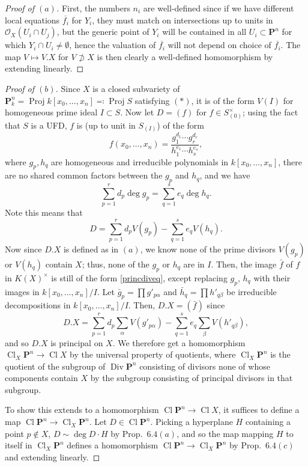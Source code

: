 \documentclass[12pt,letterpaper]{article}
\theoremstyle{definition}
\theoremstyle{remark}
\numberwithin{equation}{section}
\numberwithin{figure}{problem}
\DeclareMathOperator{\Proj}{Proj}
\DeclareMathOperator{\Div}{Div}
\DeclareMathOperator{\Cl}{Cl}
\newcommand{\OO}{\mathcal{O}}
\begin{document}
\begin{proof}[Proof of $(a)$]
  First, the numbers $n_i$ are well-defined since if we have different local equations $\overline{f_i}$ for $Y_i$, they must match on intersections up to units in $\OO_X(U_i \cap U_j)$, but the generic point of $Y_i$ will be contained in all $U_i \subset \mathbf{P}^n$ for which $Y_i \cap U_i \ne \emptyset$, hence the valuation of $\overline{f_i}$ will not depend on choice of $\overline{f_i}$. The map $V \mapsto V.X$ for $V \not\supset X$ is then clearly a well-defined homomorphism by extending linearly.
\end{proof}
\begin{proof}[Proof of $(b)$]
  Since $X$ is a closed subvariety of $\mathbf{P}^n_k = \Proj k[x_0,\ldots,x_n] \eqqcolon \Proj S$ satisfying $(*)$, it is of the form $V(I)$ for homogeneous prime ideal $I \subset S$. Now let $D = (f)$ for $f \in S_{(0)}^\times$; using the fact that $S$ is a UFD, $f$ is (up to unit in $S_{(I)}$) of the form
  \begin{equation}\label{princdiveq}
    f(x_0,\ldots,x_n) = \frac{g_1^{d_1} \cdots g_r^{d_r}}{h_1^{e_1} \cdots h_s^{e_s}},
  \end{equation}
  where $g_p,h_q$ are homogeneous and irreducible polynomials in $k[x_0,\ldots,x_n]$, there are no shared common factors between the $g_p$ and $h_q$, and we have
  \begin{equation*}
    \sum_{p=1}^r d_p\deg g_p = \sum_{q=1}^s e_q \deg h_q.
  \end{equation*}
  Note this means that
  \begin{equation*}
    D = \sum_{p=1}^r d_p V(g_p) - \sum_{q=1}^s e_q V(h_q).
  \end{equation*}
  Now since $D.X$ is defined as in $(a)$, we know none of the prime divisors $V(g_p)$ or $V(h_q)$ contain $X$; thus, none of the $g_p$ or $h_q$ are in $I$. Then, the image $\bar{f}$ of $f$ in $K(X)^\times$ is still of the form \eqref{princdiveq}, except replacing $g_p$, $h_q$ with their images in $k[x_0,\ldots,x_n]/I$. Let $\bar{g}_p = \prod g'_{p\alpha}$ and $\bar{h}_q = \prod h'_{q\beta}$ be irreducible decompositions in $k[x_0,\ldots,x_n]/I$. Then, $D.X = (\bar{f})$ since
  \begin{equation*}
    D.X = \sum_{p=1}^r d_p \sum_\alpha V(g'_{p\alpha}) - \sum_{q=1}^s e_q \sum_\beta V(h'_{q\beta}),
  \end{equation*}
  and so $D.X$ is principal on $X$. We therefore get a homomorphism $\Cl_X \mathbf{P}^n \to \Cl X$ by the universal property of quotients, where $\Cl_X \mathbf{P}^n$ is the quotient of the subgroup of $\Div \mathbf{P}^n$ consisting of divisors none of whose components contain $X$ by the subgroup consisting of principal divisors in that subgroup.
  \par To show this extends to a homomorphism $\Cl \mathbf{P}^n \to \Cl X$, it suffices to define a map $\Cl \mathbf{P}^n \to \Cl_X \mathbf{P}^n$. Let $D \in \Cl \mathbf{P}^n$. Picking a hyperplane $H$ containing a point $p \notin X$, $D \sim \deg D \cdot H$ by Prop.~$6.4(a)$, and so the map mapping $H$ to itself in $\Cl_X \mathbf{P}^n$ defines a homomorphism $\Cl \mathbf{P}^n \to \Cl_X \mathbf{P}^n$ by Prop.~$6.4(c)$ and extending linearly.
\end{proof}
\end{document}
